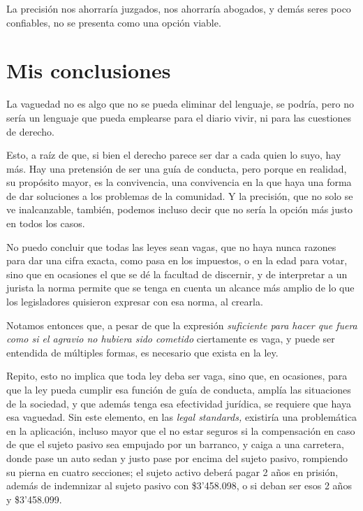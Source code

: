 \documentclass[]{book}
\begin{document}
\begin{refsection}
La precisión nos ahorraría juzgados, nos ahorraría abogados, y demás
seres poco confiables, no se presenta como una opción viable.

\section*{Mis conclusiones}


La vaguedad no es algo que no se pueda eliminar del lenguaje, se podría,
pero no sería un lenguaje que pueda emplearse para el diario vivir, ni
para las cuestiones de derecho.

Esto, a raíz de que, si bien el derecho parece ser dar a cada quien lo
suyo, hay más. Hay una pretensión de ser una guía de conducta, pero
porque en realidad, su propósito mayor, es la convivencia, una
convivencia en la que haya una forma de dar soluciones a los problemas
de la comunidad. Y la precisión, que no solo se ve inalcanzable,
también, podemos incluso decir que no sería la opción más justo en todos
los casos.

No puedo concluir que todas las leyes sean vagas, que no haya nunca
razones para dar una cifra exacta, como pasa en los impuestos, o en la
edad para votar, sino que en ocasiones el que se dé la facultad de
discernir, y de interpretar a un jurista la norma permite que se tenga
en cuenta un alcance más amplio de lo que los legisladores quisieron
expresar con esa norma, al crearla.

Notamos entonces que, a pesar de que la expresión \emph{suficiente para
hacer que fuera como si el agravio no hubiera sido cometido} ciertamente
es vaga, y puede ser entendida de múltiples formas, es necesario que
exista en la ley.

Repito, esto no implica que toda ley deba ser vaga, sino que, en
ocasiones, para que la ley pueda cumplir esa función de guía de
conducta, amplía las situaciones de la sociedad, y que además tenga esa
efectividad jurídica, se requiere que haya esa vaguedad. Sin este
elemento, en las \emph{legal standards,} existiría una problemática en
la aplicación, incluso mayor que el no estar seguros si la compensación
en caso de que el sujeto pasivo sea empujado por un barranco, y caiga a
una carretera, donde pase un auto sedan y justo pase por encima del
sujeto pasivo, rompiendo su pierna en cuatro secciones; el sujeto activo
deberá pagar 2 años en prisión, además de indemnizar al sujeto pasivo
con \$3'458.098, o si deban ser esos 2 años y \$3'458.099.


\end{refsection}
\end{document}
